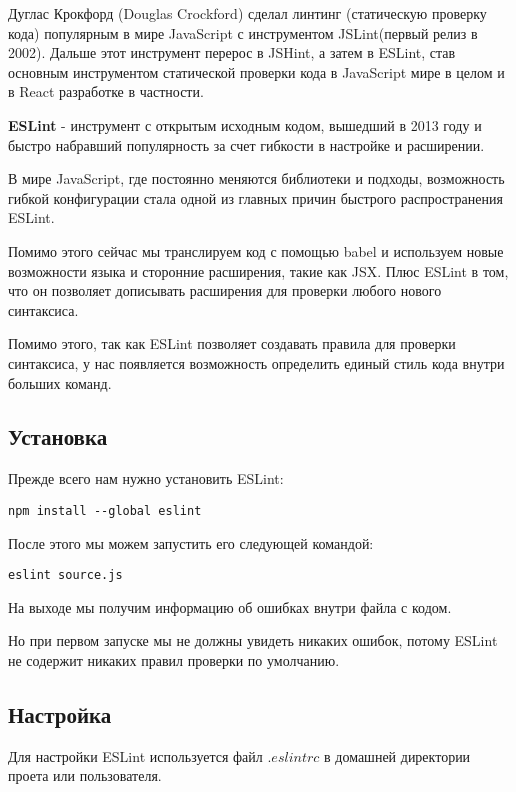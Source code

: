 Дуглас Крокфорд (Douglas Crockford) сделал линтинг (статическую проверку кода) популярным в мире JavaScript с инструментом JSLint(первый релиз в 2002). Дальше этот инструмент перерос в JSHint, а затем в ESLint, став основным инструментом статической проверки кода в JavaScript мире в целом и в React разработке в частности.

\textbf{ESLint} - инструмент с открытым исходным кодом, вышедший в 2013 году и быстро набравший популярность за счет гибкости в настройке и расширении.

В мире JavaScript, где постоянно меняются библиотеки и подходы, возможность гибкой конфигурации стала одной из главных причин быстрого распространения ESLint. 

Помимо этого сейчас мы транслируем код с помощью babel и используем новые возможности языка и сторонние расширения, такие как JSX. Плюс ESLint в том, что он позволяет дописывать расширения для проверки любого нового синтаксиса.

Помимо этого, так как ESLint позволяет создавать правила для проверки синтаксиса, у нас появляется возможность определить единый стиль кода внутри больших команд.


\subsection{Установка}

Прежде всего нам нужно установить ESLint:

\begin{lstlisting}
npm install --global eslint
\end{lstlisting}

После этого мы можем запустить его следующей командой:

\begin{lstlisting}
eslint source.js
\end{lstlisting}

На выходе мы получим информацию об ошибках внутри файла с кодом.

Но при первом запуске мы не должны увидеть никаких ошибок, потому ESLint не содержит никаких правил проверки по умолчанию.

\subsection{Настройка}

Для настройки ESLint используется файл $.eslintrc$ в домашней директории проета или пользователя.

